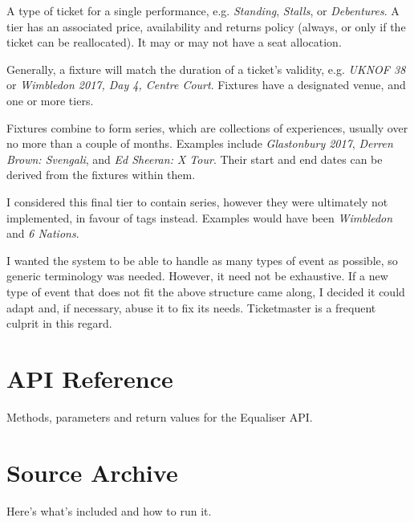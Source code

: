 \documentclass[12pt]{bhamdissertation}
\begin{document}
\begin{description}[style=nextline]
    \item[Tiers] A type of ticket for a single performance, e.g. \textit{Standing}, \textit{Stalls}, or \textit{Debentures}. A tier has an associated price, availability and returns policy (always, or only if the ticket can be reallocated). It may or may not have a seat allocation.
    \item[Fixtures] Generally, a fixture will match the duration of a ticket's validity, e.g. \textit{UKNOF 38} or \textit{Wimbledon 2017, Day 4, Centre Court}. Fixtures have a designated venue, and one or more tiers.
    \item[Series] Fixtures combine to form series, which are collections of experiences, usually over no more than a couple of months. Examples include \textit{Glastonbury 2017}, \textit{Derren Brown: Svengali}, and \textit{Ed Sheeran: X Tour}. Their start and end dates can be derived from the fixtures within them.
    \item[Headlines] I considered this final tier to contain series, however they were ultimately not implemented, in favour of tags instead. Examples would have been \textit{Wimbledon} and \textit{6 Nations}.
\end{description}

I wanted the system to be able to handle as many types of event as possible, so generic terminology was needed. However, it need not be exhaustive. If a new type of event that does not fit the above structure came along, I decided it could adapt and, if necessary, abuse it to fix its needs. Ticketmaster is a frequent culprit in this regard.

\appendix
\begin{appendices}


\chapter{API Reference}
\label{appendix:api_reference}

Methods, parameters and return values for the Equaliser API.

\chapter{Source Archive}
\label{appendix:source_archive}

Here's what's included and how to run it.

\end{appendices}

\cleardoublepage  %
\printbibliography
\end{document}
